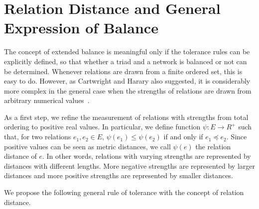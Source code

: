 {\section{Relation Distance and General Expression of Balance}\label{relation distance}
The concept of extended balance is meaningful only if the tolerance
rules can be explicitly defined, so that whether a triad and a network
is balanced or not can be determined. Whenever relations
are drawn from a finite ordered set, this is easy to do. However, as Cartwright and Harary also suggested, 
it is considerably more complex in the general case when the strengths
of relations are drawn from arbitrary numerical values~\cite{Cartwright:56}.
 
As a first step, we refine the measurement of relations with
strengths from total ordering to positive real values. In particular,
we define function $\psi: E \rightarrow R^{+}$ such that, for two
relations $e_{1}, e_{2} \in E$, $\psi(e_{1}) \leq \psi(e_{2})$ if and
only if $e_{1} \preceq e_{2}$.  Since positive values can be seen as
metric distances, we call $\psi(e)$ the relation distance of $e$.  In
other words, relations with varying strengths are represented by
distances with different lengths.  More negative strengths are
represented by larger distances and more positive strengths are
represented by smaller distances.



We propose the following general rule of tolerance with the
concept of relation distance.

}
